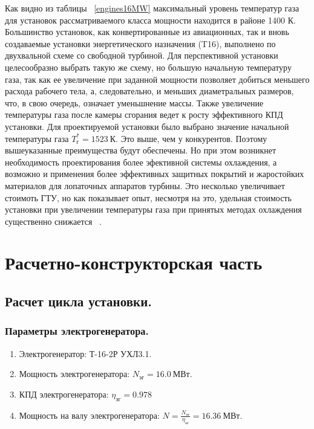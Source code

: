 \documentclass[a4paper,12pt]{article}
\begin{document}
    Как видно из таблицы ~\ref{engines16MW} максимальный уровень температур газа для установок рассматриваемого
    класса мощности находится в районе 1400 К.
    Большинство установок, как конвертированные из авиационных, так и вновь создаваемые установки энергетического
    назначения (T16), выполнено по двухвальной схеме со свободной турбиной.
    Для перспективной установки целесообразно выбрать такую же схему, но большую начальную температуру газа,
    так как ее увеличение при заданной мощности позволяет добиться меньшего расхода рабочего тела, а, следовательно,
    и меньших диаметральных размеров, что, в свою очередь, означает уменьшнение массы.
    Также увеличение температуры газа после камеры сгорания ведет к росту эффективного КПД установки.
    Для проектируемой установки было выбрано значение начальной температуры газа $T_г^* = 1523\ К$.
    Это выше, чем у конкурентов.
    Поэтому вышеуказанные преимущества будут обеспечены.
    Но при этом возникнет необходимость проектирования более эфективной системы охлаждения, а
    возможно и применения более эффективных защитных покрытий и жаростойких материалов для лопаточных
    аппаратов турбины.
    Это несколько увеличивает стоимоть ГТУ, но как показывает опыт, несмотря на это, удельная стоимость установки
    при увеличении температуры газа при принятых методах охлаждения существенно снижается ~\cite{manushin_eliseev_proektirovanie}.

    \newpage

    \section{Расчетно-конструкторская часть}

    \subsection{Расчет цикла установки.}

    \subsubsection{Параметры электрогенератора.}

%    
\begin{enumerate}
	\item Электрогенератор: Т-16-2Р УХЛ3.1.
	\item Мощность электрогенератора: $N_{эг} = 16.0\ МВт$.
	\item КПД электрогенератора: $\eta_{эг} = 0.978$
	\item Мощность на валу электрогенератора: $N = \frac{N_{эг}}{\eta_{эг}} = 16.36\ МВт$.
\end{enumerate}
\end{document}
